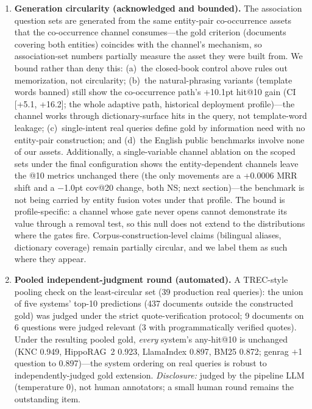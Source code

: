 \documentclass[sigconf,nonacm]{acmart}
\begin{document}
\begin{enumerate}
\item \textbf{Generation circularity (acknowledged and bounded).} The
association question sets are generated from the same entity-pair
co-occurrence assets that the co-occurrence channel consumes---the gold
criterion (documents covering both entities) coincides with the channel's
mechanism, so association-set numbers partially measure the asset they
were built from. We bound rather than deny this: (a)~the closed-book
control above rules out memorization, not circularity; (b)~the
natural-phrasing variants (template words banned) still show the
co-occurrence path's +10.1pt hit@10 gain (CI [+5.1, +16.2]; the whole
adaptive path, historical deployment profile)---the
channel works through
dictionary-surface hits in the query, not template-word leakage; (c)~single-intent real queries define
gold by information need with no entity-pair construction; and (d)~the
English public benchmarks involve none of our assets. Additionally, a
single-variable channel ablation on the scoped sets under the final
configuration shows the entity-dependent channels leave the @10 metrics
unchanged there (the only movements are a +0.0006 MRR shift and a
$-$1.0pt cov@20 change, both NS; next section)---the benchmark is not
being carried by entity fusion votes under that profile. The bound is
profile-specific: a channel whose gate never opens cannot demonstrate
its value through a removal test, so this null does not extend to the
distributions where the gates fire. Corpus-construction-level claims
(bilingual aliases, dictionary coverage) remain partially circular, and
we label them as such where they appear.

\item \textbf{Pooled independent-judgment round (automated).} A
TREC-style pooling check on the least-circular set (39 production real
queries): the union of five systems' top-10 predictions (437 documents
outside the constructed gold) was judged under the strict
quote-verification protocol; 9 documents on 6 questions were judged
relevant (3 with programmatically verified quotes). Under the resulting
pooled gold, \emph{every} system's any-hit@10 is unchanged (KNC 0.949,
HippoRAG~2 0.923, LlamaIndex 0.897, BM25 0.872; genrag $+$1 question to
0.897)---the system ordering on real queries is robust to
independently-judged gold extension. \emph{Disclosure:} judged by the
pipeline LLM (temperature 0), not human annotators; a small human round
remains the outstanding item.
\end{enumerate}
\end{document}
